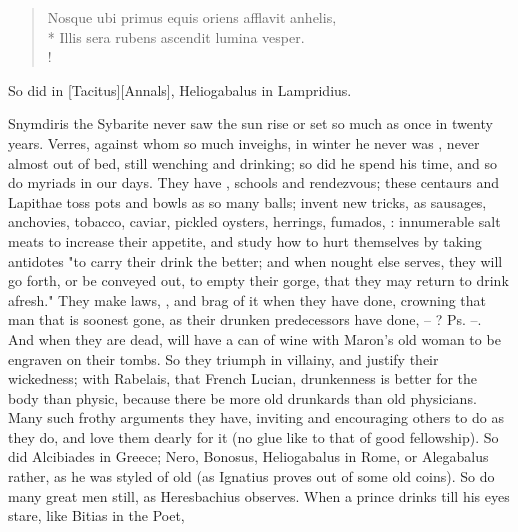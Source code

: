 \begin{latin}
\begin{verse}%
Nosque ubi primus equis oriens afflavit anhelis,\\*
Illis sera rubens ascendit lumina vesper.\\!
\end{verse}%
\end{latin}

So did \Petronius in [Tacitus][Annals], Heliogabalus in Lampridius.


Snymdiris the Sybarite never saw the sun rise or set so much as once in twenty
years. Verres, against whom \Tully{} so much inveighs, in winter he never was
, never almost out of bed,
still wenching and drinking; so did he spend his time, and
so do myriads in our days. They have , schools and
rendezvous; these centaurs and Lapithae toss pots and bowls as so many balls;
invent new tricks, as sausages, anchovies, tobacco, caviar, pickled oysters,
herrings, fumados, \etc{}: innumerable salt meats to increase their appetite,
and study how to hurt themselves by taking antidotes "to
carry their drink the better; and when nought else serves,
they will go forth, or be conveyed out, to empty their gorge, that they may
return to drink afresh." They make laws, , and brag of it when they have done, crowning
that man that is soonest gone, as their drunken predecessors have done, --
? Ps.  --. And when they are dead, will have a can of wine with
Maron's old woman to be engraven on their tombs. So they
triumph in villainy, and justify their wickedness; with Rabelais, that French
Lucian, drunkenness is better for the body than physic, because there be more
old drunkards than old physicians. Many such frothy arguments they have,
inviting and encouraging others to do as they do, and love
them dearly for it (no glue like to that of good fellowship). So did Alcibiades
in Greece; Nero, Bonosus, Heliogabalus in Rome, or Alegabalus rather, as he was
styled of old (as Ignatius proves out of some old coins).
So do many great men still, as Heresbachius observes. When
a prince drinks till his eyes stare, like Bitias in the Poet,

